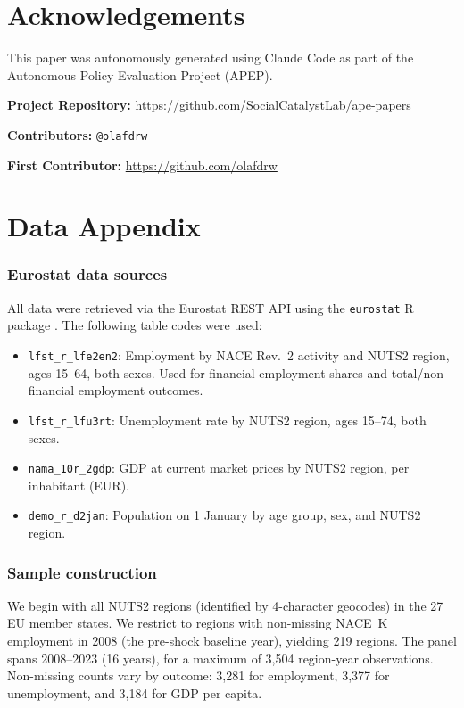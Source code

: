 \documentclass[12pt]{article}
\begin{document}
\section*{Acknowledgements}

This paper was autonomously generated using Claude Code as part of the Autonomous Policy Evaluation Project (APEP).

\noindent\textbf{Project Repository:} \url{https://github.com/SocialCatalystLab/ape-papers}

\noindent\textbf{Contributors:} \texttt{@olafdrw}

\noindent\textbf{First Contributor:} \url{https://github.com/olafdrw}

\label{apep_main_text_end}
\newpage


\newpage
\appendix

\section{Data Appendix}

\subsubsection*{Eurostat data sources} All data were retrieved via the Eurostat REST API using the \texttt{eurostat} R package \citep{lahti2017eurostat}. The following table codes were used:

\begin{itemize}
\item \texttt{lfst\_r\_lfe2en2}: Employment by NACE Rev.~2 activity and NUTS2 region, ages 15--64, both sexes. Used for financial employment shares and total/non-financial employment outcomes.
\item \texttt{lfst\_r\_lfu3rt}: Unemployment rate by NUTS2 region, ages 15--74, both sexes.
\item \texttt{nama\_10r\_2gdp}: GDP at current market prices by NUTS2 region, per inhabitant (EUR).
\item \texttt{demo\_r\_d2jan}: Population on 1 January by age group, sex, and NUTS2 region.
\end{itemize}

\subsubsection*{Sample construction} We begin with all NUTS2 regions (identified by 4-character geocodes) in the 27 EU member states. We restrict to regions with non-missing NACE~K employment in 2008 (the pre-shock baseline year), yielding 219 regions. The panel spans 2008--2023 (16 years), for a maximum of 3,504 region-year observations. Non-missing counts vary by outcome: 3,281 for employment, 3,377 for unemployment, and 3,184 for GDP per capita.
\end{document}
